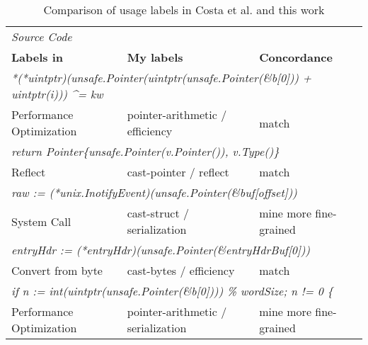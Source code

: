 \begin{table}[htp!]
    \centering
    \caption{Comparison of \unsafe{} usage labels in Costa et al. and this work}
    \label{tbl:costa-labels-comparison}
    \begin{tabularx}{\textwidth}{X|l|l}
        \multicolumn{3}{l}{\footnotesize\textit{Source Code}} \\
        \textbf{Labels in~\cite{costa2020}} & \textbf{My labels}     & \textbf{Concordance} \\
        \hline
        \multicolumn{3}{l}{\footnotesize\textit{*(*uintptr)(unsafe.Pointer(uintptr(unsafe.Pointer(\&b[0])) + uintptr(i))) \^{}= kw}} \\
        Performance Optimization   & pointer-arithmetic / efficiency     & match  \\ \hline
        \multicolumn{3}{l}{\footnotesize\textit{return Pointer\{unsafe.Pointer(v.Pointer()), v.Type()\}}} \\
        Reflect                    & cast-pointer / reflect              & match  \\ \hline
        \multicolumn{3}{l}{\footnotesize\textit{raw := (*unix.InotifyEvent)(unsafe.Pointer(\&buf[offset]))}} \\
        System Call                & cast-struct / serialization         & mine more fine-grained \\ \hline
        \multicolumn{3}{l}{\footnotesize\textit{entryHdr := (*entryHdr)(unsafe.Pointer(\&entryHdrBuf[0]))}} \\
        Convert from byte          & cast-bytes / efficiency             & match  \\ \hline
        \multicolumn{3}{l}{\footnotesize\textit{if n := int(uintptr(unsafe.Pointer(\&b[0]))) \% wordSize; n != 0 \{}} \\
        Performance Optimization   & pointer-arithmetic / serialization  & mine more fine-grained \\
        \bottomrule
    \end{tabularx}
\end{table}
